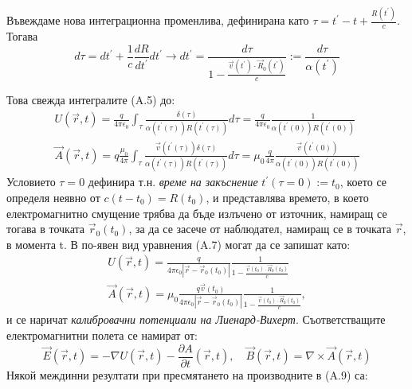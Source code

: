 \begin{appendices}
	Въвеждаме нова интеграционна променлива, дефинирана като $\tau = t^\prime - t + \frac{R(t^\prime)}{c}$. Тогава
	\begin{equation}
		d\tau = dt^\prime + \frac{1}{c}\frac{dR}{dt^\prime}dt^\prime\rightarrow dt^\prime = \frac{d\tau}{1 - \frac{\vec{v}(t^\prime)\cdot\vec{R}_0(t^\prime)}{c}} := \frac{d\tau}{\alpha(t^\prime)}
	\end{equation}
	
	Това свежда интегралите (A.5) до:
	\begin{equation}
		\begin{split}
		U(\vec{r},t) = \frac{q}{4\pi\epsilon_0}\int_\tau \frac{\delta(\tau)}{\alpha(t^\prime(\tau))R(t^\prime(\tau))}d\tau =\frac{q}{4\pi\epsilon_0} \frac{1}{\alpha(t^\prime(0))R(t^\prime(0))}\\
		\vec{A}(\vec{r},t) = q\frac{\mu_0}{4\pi}\int_\tau \frac{\vec{v}(t^\prime(\tau))\delta(\tau)}{\alpha(t^\prime(\tau))R(t^\prime(\tau))}d\tau=\mu_0\frac{q}{4\pi} \frac{\vec{v}(t^\prime(0))}{\alpha(t^\prime(0))R(t^\prime(0))}
		\end{split}
	\end{equation}
	Условието $\tau = 0$ дефинира т.н. \emph{време на закъснение} $t^\prime(\tau = 0) := t_0$, което се определя неявно от $c(t - t_0) = R(t_0)$, и представлява времето, в което електромагнитно смущение трябва да бъде излъчено от източник, намиращ се тогава в точката $\vec{r}_0(t_0)$, за да се засече от наблюдател, намиращ се в точката $\vec{r}$, в момента t. В по-явен вид уравнения (A.7) могат да се запишат като:
		\begin{equation}
		\begin{split}
			U(\vec{r},t) = \frac{q}{4\pi\epsilon_0 |\vec{r} - \vec{r}_0(t_0)|} \frac{1}{1 - \frac{\vec{v}(t_0)\cdot \vec{R}_0(t_0)}{c}}\\
			\vec{A}(\vec{r},t) = \mu_0\frac{q\vec{v}(t_0)}{4\pi\epsilon_0 |\vec{r} - \vec{r}_0(t_0)|} \frac{1}{1 - \frac{\vec{v}(t_0)\cdot \vec{R}_0(t_0)}{c}},
		\end{split}
	\end{equation}
	и се наричат \emph{калибровачни потенциали на Лиенард-Вихерт}. Съответстващите електромагнитни полета се намират от:
	\begin{equation}
		\vec{E}(\vec{r},t) = -\nabla U(\vec{r},t) - \frac{\partial A}{\partial t}(\vec{r},t),\quad \vec{B}(\vec{r},t) = \nabla\times \vec{A}(\vec{r},t)
	\end{equation}
	Някой междинни резултати при пресмятането на производните в (A.9) са:
	\begin{equation}

\end{equation}
\end{appendices}
